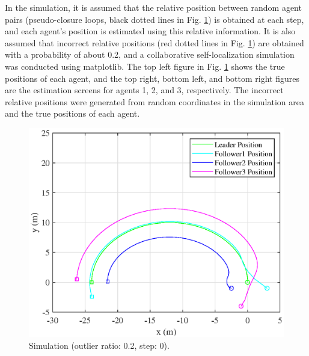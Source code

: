 \documentclass[a4paper,fleqn,10pt,twocolumn]{SICE_ISCS}
\begin{document}
In the simulation, it is assumed that the relative position between random agent pairs (pseudo-closure loops, black dotted lines in Fig. \ref{fig:simulation}) is obtained at each step, and each agent's position is estimated using this relative information. It is also assumed that incorrect relative positions (red dotted lines in Fig. \ref{fig:simulation}) are obtained with a probability of about 0.2, and a collaborative self-localization simulation was conducted using matplotlib. The top left figure in Fig. \ref{fig:simulation} shows the true positions of each agent, and the top right, bottom left, and bottom right figures are the estimation screens for agents 1, 2, and 3, respectively. The incorrect relative positions were generated from random coordinates in the simulation area and the true positions of each agent.

\begin{figure}[t]
	\begin{center}
		\includegraphics[width=\linewidth]{Fig/sampletrajectry.eps}
		\caption{Simulation (outlier ratio: 0.2, step: 0).}
		\label{fig:simulation}
	\end{center}
	\vspace{-2mm}
\end{figure}
\end{document}
